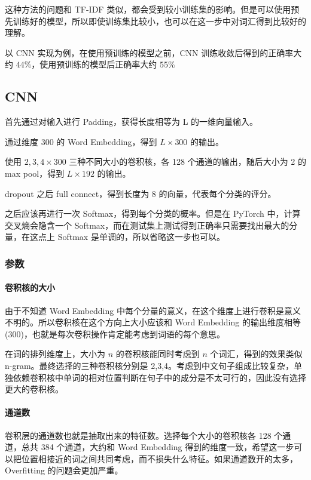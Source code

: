 \documentclass{ctexart}
\begin{document}
这种方法的问题和 TF-IDF 类似，都会受到较小训练集的影响。但是可以使用预先训练好的模型，所以即使训练集比较小，也可以在这一步中对词汇得到比较好的理解。

以 CNN 实现为例，在使用预训练的模型之前，CNN 训练收敛后得到的正确率大约 $44\%$，使用预训练的模型后正确率大约 $55\%$

\subsection{CNN}
首先通过对输入进行 Padding，获得长度相等为 L 的一维向量输入。

通过维度 300 的 Word Embedding，得到 $L \times 300$ 的输出。

使用 ${2,3,4} \times 300$ 三种不同大小的卷积核，各 128 个通道的输出，随后大小为 2 的 max pool，得到 $L \times 192$ 的输出。

dropout 之后 full connect，得到长度为 8 的向量，代表每个分类的评分。

之后应该再进行一次 Softmax，得到每个分类的概率。但是在 PyTorch 中，计算交叉熵会隐含一个 Softmax，而在测试集上测试得到正确率只需要找出最大的分量，在这点上 Softmax 是单调的，所以省略这一步也可以。

\subsubsection{参数}

\paragraph{卷积核的大小}
由于不知道 Word Embedding 中每个分量的意义，在这个维度上进行卷积是意义不明的。所以卷积核在这个方向上大小应该和 Word Embedding 的输出维度相等(300)，也就是每次卷积操作肯定能考虑到词语的每个意思。

在词的排列维度上，大小为 $n$ 的卷积核能同时考虑到 $n$ 个词汇，得到的效果类似 n-gram。最终选择的三种卷积核分别是 2,3,4。考虑到中文句子组成比较复杂，单独依赖卷积核中单词的相对位置判断在句子中的成分是不太可行的，因此没有选择更大的卷积核。

\paragraph{通道数}
卷积层的通道数也就是抽取出来的特征数。选择每个大小的卷积核各 128 个通道，总共 384 个通道，大约和 Word Embedding 得到的维度一致，希望这一步可以把位置相接近的词之间共同考虑，而不损失什么特征。如果通道数开的太多，Overfitting 的问题会更加严重。
\end{document}
